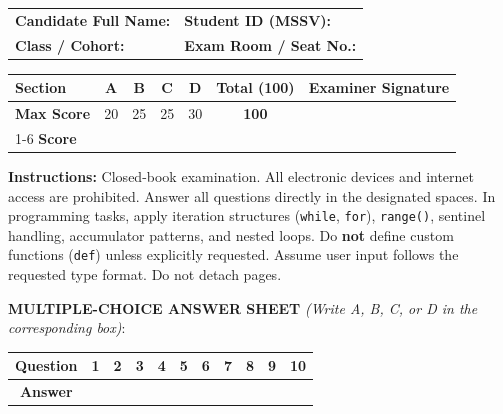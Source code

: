 \documentclass[11pt,a4paper]{article}
\begin{document}
\begin{headerbox}
\begin{tabular*}{\textwidth}{@{\extracolsep{\fill}}ll@{}}
  \textbf{Candidate Full Name:} \dotfill & \textbf{Student ID (MSSV):} \dotfill \\[0.2em]
  \textbf{Class / Cohort:} \dotfill & \textbf{Exam Room / Seat No.:} \dotfill
\end{tabular*}

\vspace{0.2em}
\renewcommand{\arraystretch}{1.05}
\setlength{\tabcolsep}{4.5pt}
\centering
\begin{tabular}{|l|c|c|c|c||c|c|}
\hline
\textbf{Section} & \textbf{A} & \textbf{B} & \textbf{C} & \textbf{D} & \textbf{Total (100)} & \textbf{Examiner Signature} \\
\hline
\textbf{Max Score} & 20 & 25 & 25 & 30 & \textbf{100} & \\[0.3em]
\cline{1-6}
\textbf{Score} & & & & & & \\[0.4em]
\hline
\end{tabular}

\vspace{0.15em}
\raggedright
\scriptsize
\textbf{Instructions:} Closed-book examination. All electronic devices and internet access are prohibited. Answer all questions directly in the designated spaces. In programming tasks, apply iteration structures (\texttt{while}, \texttt{for}), \texttt{range()}, sentinel handling, accumulator patterns, and nested loops. Do \textbf{not} define custom functions (\texttt{def}) unless explicitly requested. Assume user input follows the requested type format. Do not detach pages.
\end{headerbox}

\vspace{1mm}
\noindent
\textbf{MULTIPLE-CHOICE ANSWER SHEET} \textit{(Write A, B, C, or D in the corresponding box)}:
\begin{center}
\setlength{\tabcolsep}{5pt}
\renewcommand{\arraystretch}{1.0}
\begin{tabular}{|c|c|c|c|c|c|c|c|c|c|c|}
\hline
\textbf{Question} & \textbf{1} & \textbf{2} & \textbf{3} & \textbf{4} & \textbf{5} & \textbf{6} & \textbf{7} & \textbf{8} & \textbf{9} & \textbf{10} \\
\hline
\textbf{Answer} & & & & & & & & & & \\[1.8mm]
\hline
\end{tabular}
\end{center}
\vspace{-2.5mm}
\end{document}
